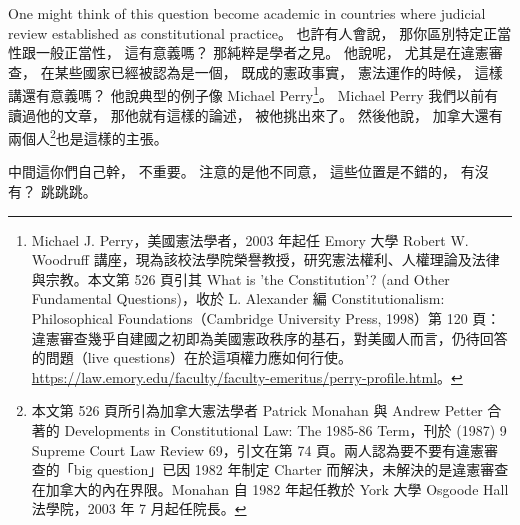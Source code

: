 \hypertarget{w02:cue:682}{}One might think of this question
\hypertarget{w02:cue:683}{}become academic in countries
\hypertarget{w02:cue:684}{}where judicial review established as constitutional practice。
\hypertarget{w02:cue:685}{}也許有人會說，
\hypertarget{w02:cue:686}{}那你區別特定正當性跟一般正當性，
\hypertarget{w02:cue:687}{}這有意義嗎？
\hypertarget{w02:cue:688}{}那純粹是學者之見。
\hypertarget{w02:cue:689}{}他說呢，
\hypertarget{w02:cue:690}{}尤其是在違憲審查，
\hypertarget{w02:cue:691}{}在某些國家已經被認為是一個，
\hypertarget{w02:cue:692}{}既成的憲政事實，
\hypertarget{w02:cue:693}{}憲法運作的時候，
\hypertarget{w02:cue:694}{}這樣講還有意義嗎？
\hypertarget{w02:cue:695}{}他說典型的例子像 Michael Perry\footnote{Michael J. Perry，美國憲法學者，2003 年起任 Emory 大學 Robert W. Woodruff 講座，現為該校法學院榮譽教授，研究憲法權利、人權理論及法律與宗教。本文第 526 頁引其 What is 'the Constitution'? (and Other Fundamental Questions)，收於 L. Alexander 編 Constitutionalism: Philosophical Foundations（Cambridge University Press, 1998）第 120 頁：違憲審查幾乎自建國之初即為美國憲政秩序的基石，對美國人而言，仍待回答的問題（live questions）在於這項權力應如何行使。\url{https://law.emory.edu/faculty/faculty-emeritus/perry-profile.html}。}。
\hypertarget{w02:cue:696}{}Michael Perry 我們以前有讀過他的文章，
\hypertarget{w02:cue:697}{}那他就有這樣的論述，
\hypertarget{w02:cue:698}{}被他挑出來了。
\hypertarget{w02:cue:699}{}然後他說，
\hypertarget{w02:cue:700}{}加拿大還有兩個人\footnote{本文第 526 頁所引為加拿大憲法學者 Patrick Monahan 與 Andrew Petter 合著的 Developments in Constitutional Law: The 1985-86 Term，刊於 (1987) 9 Supreme Court Law Review 69，引文在第 74 頁。兩人認為要不要有違憲審查的「big question」已因 1982 年制定 Charter 而解決，未解決的是違憲審查在加拿大的內在界限。Monahan 自 1982 年起任教於 York 大學 Osgoode Hall 法學院，2003 年 7 月起任院長。}也是這樣的主張。

\hypertarget{w02:cue:701}{}中間這你們自己幹，
\hypertarget{w02:cue:702}{}不重要。
\hypertarget{w02:cue:703}{}注意的是他不同意，
\hypertarget{w02:cue:704}{}這些位置是不錯的，
\hypertarget{w02:cue:705}{}有沒有？
\hypertarget{w02:cue:706}{}跳跳跳。


